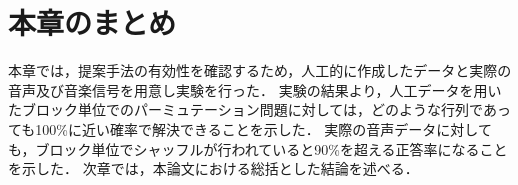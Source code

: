 \clearpage
\section{本章のまとめ}
\label{sec:matome}
本章では，提案手法の有効性を確認するため，人工的に作成したデータと実際の音声及び音楽信号を用意し実験を行った．
実験の結果より，人工データを用いたブロック単位でのパーミュテーション問題に対しては，どのような行列であっても100\%に近い確率で解決できることを示した．
実際の音声データに対しても，ブロック単位でシャッフルが行われていると90\%を超える正答率になることを示した．
次章では，本論文における総括とした結論を述べる．
